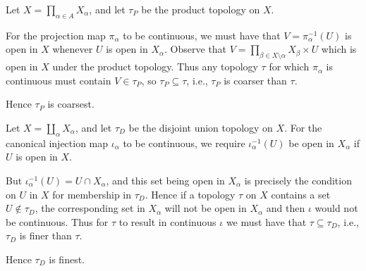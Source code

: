 \documentclass{homework651}
\begin{document}
\begin{aproblems}
\subsol
Let $X=\prod_{\alpha\in A}X_\alpha$, and let $\tau_P$ be
the product topology on $X$.

For the projection map $\pi_\alpha$ to be continuous, we must have
that $V=\pi_\alpha^{-1}(U)$ is open in $X$ whenever $U$ is open in
$X_\alpha$.  Observe that
$V=\prod_{\beta\in X\setminus\alpha} X_\beta\times U$
which is open in $X$ under the product topology. Thus any topology $\tau$ for
which $\pi_\alpha$ is continuous must contain $V\in\tau_P$, so
$\tau_P\subseteq\tau$, i.e., $\tau_P$ is coarser than $\tau$.

Hence $\tau_P$ is coarsest.

\subsol
Let $X=\coprod_\alpha X_\alpha$, and
let $\tau_D$ be the disjoint union topology on $X$.  For the
canonical injection map $\iota_\alpha$ to be continuous, we require
$\iota^{-1}_\alpha(U)$ be open in $X_\alpha$ if $U$ is open in $X$.

But $\iota^{-1}_\alpha(U)=U\cap X_\alpha$, and this set being open
in $X_\alpha$
is precisely the condition on $U$ in $X$ for membership in $\tau_D$.
Hence if a
topology $\tau$ on $X$ contains a set $U\not\in\tau_D$, the corresponding
set in $X_\alpha$ will
not be open in $X_\alpha$ and then $\iota$ would not be continuous.
Thus for $\tau$ to result in continuous $\iota$ we must have that
$\tau\subseteq\tau_D$, i.e., $\tau_D$ is finer than $\tau$.

Hence $\tau_D$ is finest.

\end{aproblems}
\end{document}
